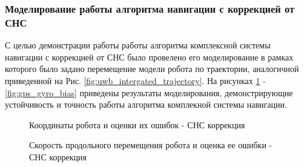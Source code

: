 \documentclass[14pt]{article}
\begin{document}
\subsubsection{Моделирование работы алгоритма навигации с коррекцией от СНС}
С целью демонстрации работы работы алгоритма комплексной системы навигации с коррекцией от СНС было провелено его моделирование в рамках которого было задано перемещение модели робота по траектории, аналогичной приведенной на Рис. \ref{fig:uwb_intergated_trajectory}. На рисунках \ref{fig:gps_coordinates} - \ref{fig:gps_gyro_bias} приведены результаты моделирования, демонстрирующие устойчивость и точность работы алгоритма комплекной системы навигации.

\begin{figure}
\noindent{}
\caption{Координаты робота и оценки их ошибок - СНС коррекция}
\label{fig:gps_coordinates}
\end{figure}

\begin{figure}
\noindent{}
\caption{Скорость продольного перемещения робота и оценка ее ошибки - СНС коррекция}
\label{fig:gps_velocities}
\end{figure}
\end{document}
